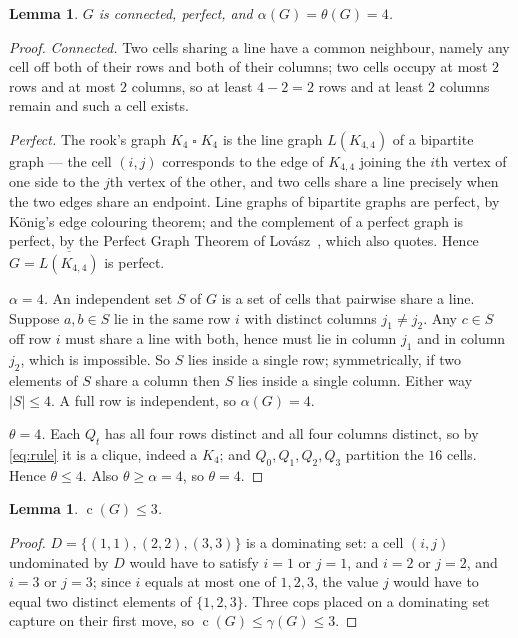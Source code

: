 \documentclass[11pt]{amsart}
\newtheorem{lemma}[theorem]{Lemma}
\theoremstyle{definition}
\DeclareMathOperator{\cop}{c}
\newcommand{\al}{\alpha}
\newcommand{\theonum}{\theta}
\newcommand{\Gwit}{G}
\begin{document}
\begin{lemma}\label{lem:basic}
$\Gwit$ is connected, perfect, and $\al(\Gwit)=\theonum(\Gwit)=4$.
\end{lemma}

\begin{proof}
\emph{Connected.} Two cells sharing a line have a common
neighbour, namely any cell off both of their rows and both of their columns;
two cells occupy at most $2$ rows and at most $2$ columns, so at least
$4-2=2$ rows and at least $2$ columns remain and such a cell exists.

\emph{Perfect.} The rook's graph $K_4\mathbin{\square}K_4$ is the line graph
$L(K_{4,4})$ of a bipartite graph --- the cell $(i,j)$ corresponds to the edge
of $K_{4,4}$ joining the $i$th vertex of one side to the $j$th vertex of the
other, and two cells share a line precisely when the two edges share an
endpoint. Line graphs of bipartite graphs are perfect, by K\"onig's edge
colouring theorem; and the complement of a perfect graph is perfect, by the
Perfect Graph Theorem of Lov\'asz~\cite{Lovasz72}, which \cite[\S1]{CZ} also
quotes. Hence $\Gwit=\overline{L(K_{4,4})}$ is perfect.

\emph{$\al=4$.} An independent set $S$ of $\Gwit$ is a set of cells that
pairwise share a line. Suppose $a,b\in S$ lie in the same row $i$ with
distinct columns $j_1\neq j_2$. Any $c\in S$ off row $i$ must share a line
with both, hence must lie in column $j_1$ and in column $j_2$, which is
impossible. So $S$ lies inside a single row; symmetrically, if two elements of
$S$ share a column then $S$ lies inside a single column. Either way
$|S|\le4$. A full row is independent, so $\al(\Gwit)=4$.

\emph{$\theonum=4$.} Each $Q_t$ has all four rows distinct and all four
columns distinct, so by \eqref{eq:rule} it is a clique, indeed a $K_4$; and
$Q_0,Q_1,Q_2,Q_3$ partition the $16$ cells. Hence $\theonum\le4$. Also
$\theonum\ge\al=4$, so $\theonum=4$.
\end{proof}

\begin{lemma}\label{lem:upper}
$\cop(\Gwit)\le3$.
\end{lemma}

\begin{proof}
$D=\{(1,1),(2,2),(3,3)\}$ is a dominating set: a cell $(i,j)$ undominated by
$D$ would have to satisfy $i=1$ or $j=1$, and $i=2$ or $j=2$, and $i=3$ or
$j=3$; since $i$ equals at most one of $1,2,3$, the value $j$ would have to
equal two distinct elements of $\{1,2,3\}$. Three cops placed on a dominating
set capture on their first move, so $\cop(\Gwit)\le\gamma(\Gwit)\le3$.
\end{proof}
\end{document}
